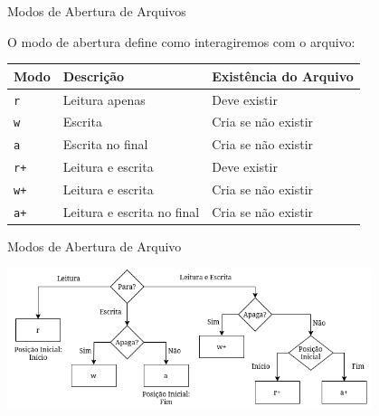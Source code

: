 \begin{frame}{Modos de Abertura de Arquivos}
    \begin{block}{}
        O modo de abertura define como interagiremos com o arquivo:
    \end{block}

    \centering
    \begin{tabular}{|l|l|l|}
        \hline
        \textbf{Modo} & \textbf{Descrição}         & \textbf{Existência do Arquivo} \\
        \hline
        \texttt{r}    & Leitura apenas             & Deve existir                   \\
        \hline
        \texttt{w}    & Escrita                    & Cria se não existir            \\
        \hline
        \texttt{a}    & Escrita no final           & Cria se não existir            \\
        \hline
        \texttt{r+}   & Leitura e escrita          & Deve existir                   \\
        \hline
        \texttt{w+}   & Leitura e escrita          & Cria se não existir            \\
        \hline
        \texttt{a+}   & Leitura e escrita no final & Cria se não existir            \\
        \hline
    \end{tabular}

\end{frame}


\begin{frame}{Modos de Abertura de Arquivo}

    \centering
    \includegraphics[width=0.8\textwidth]{Images/diagrama-modos-leitura.png}


\end{frame}


